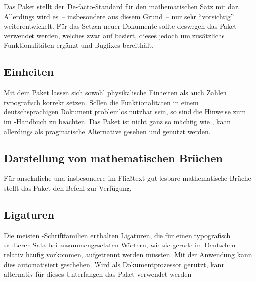 \documentclass[%
  english,ngerman,%
  cdgeometry=no,DIV=12,automark,%
]{tudscrartcl}
\begin{document}
Das Paket  stellt den De-facto-Standard für den mathematischen 
Satz mit  dar. Allerdings wird es~-- insbesondere aus diesem 
Grund~-- nur sehr \enquote{vorsichtig} weiterentwickelt. Für das Setzen neuer 
Dokumente sollte deswegen das Paket  verwendet werden, 
welches zwar auf  basiert, dieses jedoch um zusätzliche 
Funktionalitäten ergänzt und Bugfixes bereithält.


\subsection{Einheiten}
Mit dem Paket  lassen sich sowohl physikalische Einheiten als 
auch Zahlen typografisch korrekt setzen. Sollen die Funktionalitäten in einem 
deutschsprachigen Dokument problemlos nutzbar sein, so sind die Hinweise zum 
 im 
\TUDScript-Handbuch zu beachten. Das Paket  ist nicht ganz so 
mächtig wie , kann allerdings als pragmatische Alternative 
gesehen und genutzt werden.


\subsection{Darstellung von mathematischen Brüchen}
Für ansehnliche und insbesondere im Fließtext gut lesbare mathematische Brüche 
stellt das Paket  den Befehl  zur Verfügung.
%
\begin{Preamble}
\usepackage{xfrac}

\end{Preamble}


\subsection{Ligaturen}
Die meisten -Schriftfamilien enthalten Ligaturen, die für einen 
typografisch sauberen Satz bei zusammengesetzten Wörtern, wie sie gerade im 
Deutschen relativ häufig vorkommen, aufgetrennt werden müssten. Mit der 
Anwendung \href{http://www.ctan.org/pkg/delig}{} kann dies 
automatisiert geschehen. Wird  als Dokumentprozessor genutzt, 
kann alternativ für dieses Unterfangen das Paket  verwendet 
werden.
\end{document}
